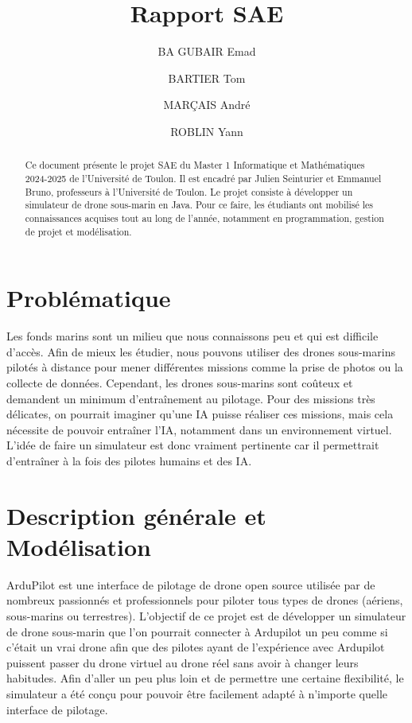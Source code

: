 \documentclass{scrartcl}
\title{Rapport SAE}
\author{BA GUBAIR Emad \and BARTIER Tom \and MARÇAIS André \and ROBLIN Yann}
\begin{document}
\maketitle{}

\begin{abstract}
    Ce document présente le projet SAE du Master 1 Informatique et Mathématiques 2024-2025
    de l’Université de Toulon. Il est encadré par Julien Seinturier et Emmanuel Bruno, professeurs à l’Université de Toulon.
    Le projet consiste à développer un simulateur de drone sous-marin en Java. Pour ce faire, les étudiants
    ont mobilisé les connaissances acquises tout au long de l’année, notamment en programmation, gestion de projet et
    modélisation.
\end{abstract}

\tableofcontents

\section{Problématique}
Les fonds marins sont un milieu que nous connaissons peu et qui est difficile d'accès.
Afin de mieux les étudier, nous pouvons utiliser des drones sous-marins pilotés à distance
pour mener différentes missions comme la prise de photos ou la collecte de données.
Cependant, les drones sous-marins sont coûteux et demandent un minimum d'entraînement au pilotage.
Pour des missions très délicates, on pourrait imaginer qu'une IA puisse réaliser ces missions, mais cela
nécessite de pouvoir entraîner l'IA, notamment dans un environnement virtuel. L'idée de faire un simulateur
est donc vraiment pertinente car il permettrait d'entraîner à la fois des pilotes humains et des IA.

\section{Description générale et Modélisation}
ArduPilot est une interface de pilotage de drone open source utilisée par de nombreux passionnés et professionnels
pour piloter tous types de drones (aériens, sous-marins ou terrestres). L'objectif de ce projet est de développer un simulateur
de drone sous-marin que l'on pourrait connecter à Ardupilot un peu comme si c'était un vrai drone afin que des pilotes ayant de l'expérience
avec Ardupilot puissent passer du drone virtuel au drone réel sans avoir à changer leurs habitudes. Afin d'aller un peu plus loin et de permettre
une certaine flexibilité, le simulateur a été conçu pour pouvoir être facilement adapté à n'importe quelle interface de pilotage.
\\
\end{document}
